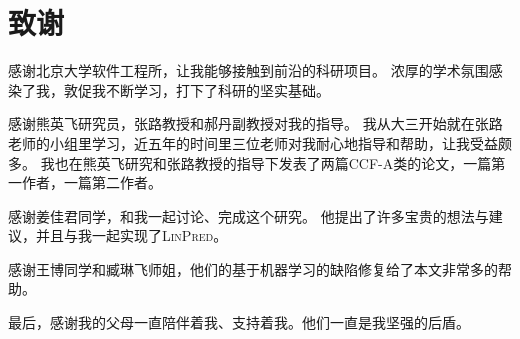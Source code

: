 \chapter{致谢}

感谢北京大学软件工程所，让我能够接触到前沿的科研项目。
浓厚的学术氛围感染了我，敦促我不断学习，打下了科研的坚实基础。

感谢熊英飞研究员，张路教授和郝丹副教授对我的指导。
我从大三开始就在张路老师的小组里学习，近五年的时间里三位老师对我耐心地指导和帮助，让我受益颇多。
我也在熊英飞研究和张路教授的指导下发表了两篇CCF-A类的论文，一篇第一作者，一篇第二作者。

感谢姜佳君同学，和我一起讨论、完成这个研究。
他提出了许多宝贵的想法与建议，并且与我一起实现了\textsc{LinPred}。

感谢王博同学和臧琳飞师姐，他们的基于机器学习的缺陷修复给了本文非常多的帮助。

最后，感谢我的父母一直陪伴着我、支持着我。他们一直是我坚强的后盾。